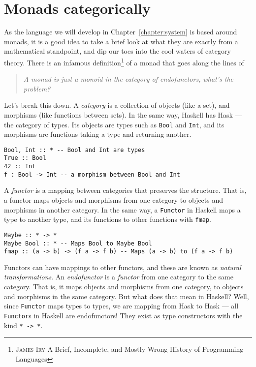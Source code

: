 \section{Monads categorically}
As the language we will develop in Chapter~\ref{chapter:system} is
based around monads, it is a good idea to take a brief look at what
they are exactly from a mathematical standpoint, and dip our toes into
the cool waters of category theory. There is an infamous
definition\footnote{\textsc{James Iry} A Brief, Incomplete, and Mostly
  Wrong History of Programming Languages} of a monad that goes along
the lines of
\begin{quote}
  \textsl{A monad is just a monoid in the category of endofunctors,
    what's the problem?}
\end{quote}
Let's break this down. A \textit{category} is a collection of objects
(like a set), and morphisms (like functions between sets). In the same
way, Haskell has \textsf{Hask} --- the category of types. Its objects
are types such as \texttt{Bool} and
\texttt{Int}, and its morphisms are functions taking a
type and returning another.
\begin{verbatim}
Bool, Int :: * -- Bool and Int are types
True :: Bool
42 :: Int
f : Bool -> Int -- a morphism between Bool and Int
\end{verbatim}
A \textit{functor} is a mapping between categories that
preserves the structure. That is, a functor maps objects and morphisms
from one category to objects and morphisms in another category.
In the same way, a \texttt{Functor} in Haskell maps a
type to another type, and its functions to other functions with
\texttt{fmap}. 
\begin{verbatim}
Maybe :: * -> *
Maybe Bool :: * -- Maps Bool to Maybe Bool
fmap :: (a -> b) -> (f a -> f b) -- Maps (a -> b) to (f a -> f b)
\end{verbatim}
Functors can have mappings to other functors, and these are known as
\emph{natural transformations}.
An \textit{endofunctor} is a \textit{functor} from one category to the
same category. That is, it maps objects and morphisms from one
category, to objects and morphisms in the same category. But what does
that mean in Haskell? Well, since \texttt{Functor} maps
types to types, we are mapping from \textsf{Hask} to \textsf{Hask} ---
all \texttt{Functor}s in Haskell are endofunctors! They
exist as type constructors with the kind \texttt{* -> *}.

